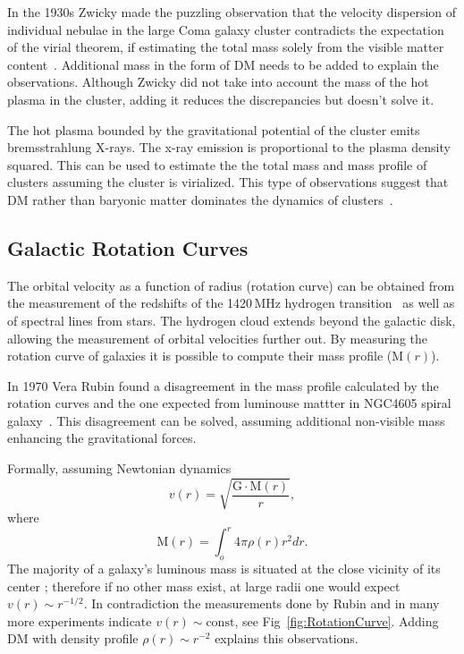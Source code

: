 In the 1930s Zwicky made the puzzling observation that the velocity dispersion of individual nebulae in the large Coma galaxy cluster contradicts the expectation of the virial theorem, if estimating the total mass solely from the visible matter content~\cite{Zwicky:1937zza}. Additional mass in the form of DM needs to be added to explain the observations. Although Zwicky did not take into account the mass of the hot plasma in the cluster, adding it reduces the discrepancies but doesn't solve it. 

The hot plasma bounded by the gravitational potential of the cluster emits bremsstrahlung X-rays. The x-ray emission is proportional to the plasma density squared. This can be used to estimate the the total mass and mass profile of clusters assuming the cluster is virialized. This type of observations suggest that DM rather than baryonic matter dominates the dynamics of clusters~\cite{Lewis:2002mfa}.

 


\subsection{Galactic Rotation Curves}
\label{subsec:RotCurve}
The orbital velocity as a function of radius (rotation curve) can be obtained from the measurement of the redshifts of the 1420\,MHz hydrogen transition~\cite{Begeman:1991iy} as well as of spectral lines from stars. The hydrogen cloud extends beyond the galactic disk, allowing the measurement of orbital velocities further out. By measuring the rotation curve of galaxies it is possible to compute their mass profile ($\textrm{M}(r)$).

In 1970 Vera Rubin found a disagreement in the mass profile calculated by the rotation curves and the one expected from luminouse mattter in NGC4605 spiral galaxy~\cite{Rubin:1980zd}. This disagreement can be solved, assuming additional non-visible mass enhancing the gravitational forces.

Formally, assuming Newtonian dynamics
\begin{equation}
\label{v_r}
v(r) = \sqrt{\frac{\mathrm{G}\cdot \mathrm{M}(r)}{r}},
\end{equation} 
where
\begin{equation}
\label{M_r}
\mathrm{M}(r) =  \int_o^r 4\pi \rho(r)r^2dr.
\end{equation}
The majority of a galaxy's luminous mass is situated at the close vicinity of its center  ; therefore if no other mass exist, at large radii one would expect $v(r) \sim r^{-1/2}$. In contradiction the measurements done by Rubin and in many more experiments indicate $v(r) \sim \mathrm{const}$, see Fig~\ref{fig:RotationCurve}. Adding DM with density profile $\rho(r) \sim r^{-2}$ explains this observations.


